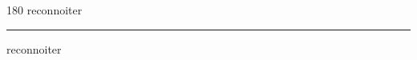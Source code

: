 
\begin{frame}
\begin{center}
\begin{turn}{180}
{\fontsize{2.5cm}{1em}\selectfont reconnoiter}
\end{turn}
\vspace{1em}\par  
\hrule
\vspace{1em}\par  
{\fontsize{2.5cm}{1em}\selectfont reconnoiter}
\end{center}
\end{frame}

